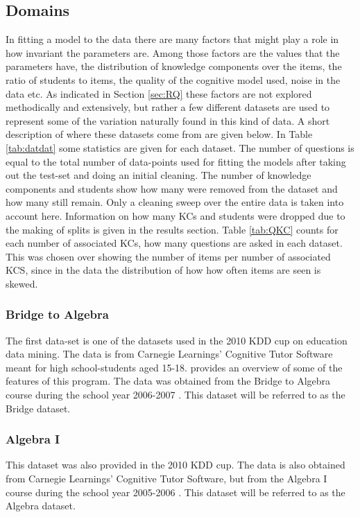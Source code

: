 \documentclass{scrartcl}
\begin{document}
\subsection{Domains}
\label{sec:domain}
In fitting a model to the data there are many factors that might play a role in how invariant the parameters are. Among those factors are the values that the parameters have, the distribution of knowledge components over the items, the ratio of students to items, the quality of the cognitive model used, noise in the data etc. As indicated in Section \ref{sec:RQ} these factors are not explored methodically and extensively, but rather a few different datasets are used to represent some of the variation naturally found in this kind of data. A short description of where these datasets come from are given below. In Table \ref{tab:datdat} some statistics are given for each dataset. The number of questions is equal to the total number of data-points used for fitting the models after taking out the test-set and doing an initial cleaning. The number of knowledge components and students show how many were removed from the dataset and how many still remain. Only a cleaning sweep over the entire data is taken into account here. Information on how many KCs and students were dropped due to the making of splits is given in the results section. Table \ref{tab:QKC} counts for each number of associated KCs, how many questions are asked in each dataset. This was chosen over showing the number of items per number of associated KCS, since in the data the distribution of how how often items are seen is skewed. 

\subsubsection{Bridge to Algebra}
The first data-set is one of the datasets used in the 2010 KDD cup on education data mining. The data is from Carnegie Learnings' Cognitive Tutor Software meant for high school-students aged 15-18. \cite{ct} provides an overview of some of the features of this program. The data was obtained from the Bridge to Algebra course during the school year 2006-2007 \cite{bridge}. This dataset will be referred to as the Bridge dataset.

\subsubsection{Algebra I}
This dataset was also provided in the 2010 KDD cup. The data is also obtained from Carnegie Learnings' Cognitive Tutor Software, but from the Algebra I course during the school year 2005-2006 \cite{algebra}. This dataset will be referred to as the Algebra dataset.
\end{document}
